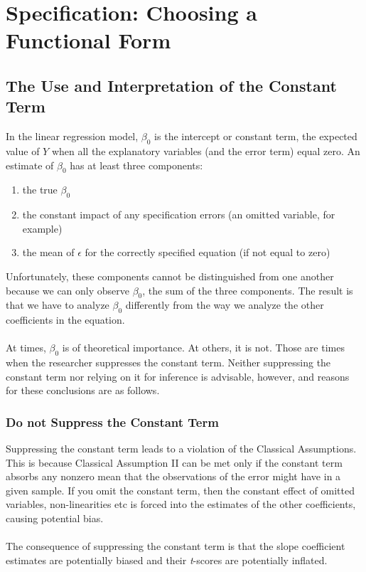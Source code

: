 \documentclass[11pt]{article}
\begin{document}
\section{Specification: Choosing a Functional Form}
\subsection{The Use and Interpretation of the Constant Term}
In the linear regression model, $\beta_0$ is the intercept or constant term, the expected value of $Y$ when all the explanatory variables (and the error term) equal zero. An estimate of $\beta_0$ has at least three components:
\begin{enumerate}
\item the true $\beta_{0}$
\item the constant impact of any specification errors (an omitted variable, for example)
\item the mean of $\epsilon$ for the correctly specified equation (if not equal to zero)
\end{enumerate}
Unfortunately, these components cannot be distinguished from one another because we can only observe $\beta_0$, the sum of the three components. The result is that we have to analyze $\beta_0$ differently from the way we analyze the other coefficients in the equation. \\ \\
At times, $\beta_0$ is of theoretical importance. At others, it is not. Those are times when the researcher suppresses the constant term. Neither suppressing the constant term nor relying on it for inference is advisable, however, and reasons for these conclusions are as follows.
\subsubsection{Do not Suppress the Constant Term}
Suppressing the constant term leads to a violation of the Classical Assumptions. This is because Classical Assumption II can be met only if the constant term absorbs any nonzero mean that the observations of the error might have in a given sample. If you omit the constant term, then the constant effect of omitted variables, non-linearities etc is forced into the estimates of the other coefficients, causing potential bias.\\ \\
The consequence of suppressing the constant term is that the slope coefficient estimates are potentially biased and their \textit{t}-scores are potentially inflated.
\end{document}

